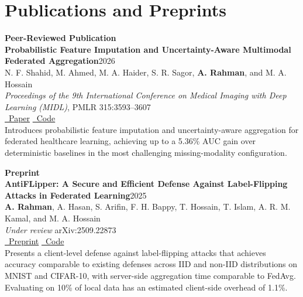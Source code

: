 \documentclass[10pt,letterpaper]{article}
\begin{document}
\section{Publications and Preprints}
\textbf{Peer-Reviewed Publication}
\\[2pt]
\textbf{Probabilistic Feature Imputation and Uncertainty-Aware Multimodal Federated Aggregation}\hfill 2026\\[-1pt]
N. F. Shahid, M. Ahmed, M. A. Haider, S. R. Sagor, \textbf{A. Rahman}, and M. A. Hossain\\[-1pt]
{\small\color{mutedColor}\textit{Proceedings of the 9th International Conference on Medical Imaging with Deep Learning (MIDL)}, PMLR 315:3593--3607}\\[-1pt]
\href{https://proceedings.mlr.press/v315/shahid26a.html}{\faFile\ Paper}
\quad \href{https://github.com/NafisFuadShahid/PFIN-UQAVG}{\faGithub\ Code}\\[-1pt]
Introduces probabilistic feature imputation and uncertainty-aware aggregation for federated healthcare learning, achieving up to a 5.36\% AUC gain over deterministic baselines in the most challenging missing-modality configuration.

\vspace{6pt}
\textbf{Preprint}
\\[2pt]
\textbf{AntiFLipper: A Secure and Efficient Defense Against Label-Flipping Attacks in Federated Learning}\hfill 2025\\[-1pt]
\textbf{A. Rahman}, A. Hasan, S. Arifin, F. H. Bappy, T. Hossain, T. Islam, A. R. M. Kamal, and M. A. Hossain\\[-1pt]
{\small\color{mutedColor}\textit{Under review} \quad arXiv:2509.22873}\\[-1pt]
\href{https://arxiv.org/abs/2509.22873}{\faFile\ Preprint}
\quad \href{https://github.com/abidh8820/AntiFlipper}{\faGithub\ Code}\\[-1pt]
Presents a client-level defense against label-flipping attacks that achieves accuracy comparable to existing defenses across IID and non-IID distributions on MNIST and CIFAR-10, with server-side aggregation time comparable to FedAvg. Evaluating on 10\% of local data has an estimated client-side overhead of 1.1\%.
\end{document}
